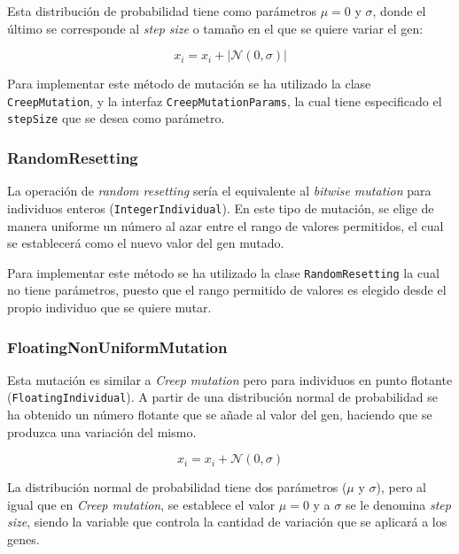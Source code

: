 Esta distribución de probabilidad tiene como parámetros $\mu = 0$ y $\sigma$, donde el último se corresponde al \textit{step size} o tamaño en el que se quiere variar el gen:

\begin{equation}
    x_i = x_i + |\mathcal{N}(0, \sigma)|
\end{equation}

Para implementar este método de mutación se ha utilizado la clase \texttt{CreepMutation}, y la interfaz \texttt{CreepMutationParams}, la cual tiene especificado el \texttt{stepSize} que se desea como parámetro.

\subsubsection{RandomResetting}

La operación de \textit{random resetting} sería el equivalente al \textit{bitwise mutation} para individuos enteros (\texttt{IntegerIndividual}). En este tipo de mutación, se elige de manera uniforme un número al azar entre el rango de valores permitidos, el cual se establecerá como el nuevo valor del gen mutado.

Para implementar este método se ha utilizado la clase \texttt{RandomResetting} la cual no tiene parámetros, puesto que el rango permitido de valores es elegido desde el propio individuo que se quiere mutar.

\subsubsection{FloatingNonUniformMutation}

Esta mutación es similar a \textit{Creep mutation} pero para individuos en punto flotante (\texttt{FloatingIndividual}). A partir de una distribución normal de probabilidad se ha obtenido un número flotante que se añade al valor del gen, haciendo que se produzca una variación del mismo.

\begin{equation}
    x_i = x_i + \mathcal{N}(0, \sigma)
\end{equation}

La distribución normal de probabilidad tiene dos parámetros ($\mu$ y $\sigma$), pero al igual que en \textit{Creep mutation}, se establece el valor $\mu = 0$ y a $\sigma$ se le denomina \textit{step size}, siendo la variable que controla la cantidad de variación que se aplicará a los genes. \\

